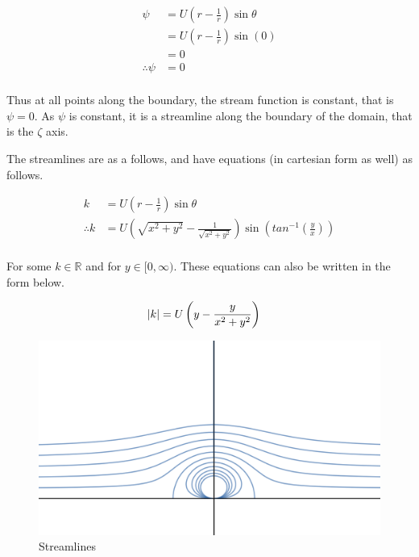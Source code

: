 \documentclass[a4paper]{article}
\begin{document}
\begin{enumerate}[label=\textbf{\arabic*.}]
\begin{enumerate}
\begin{enumerate}
			\begin{align*}
			\psi & = U\left(r - \frac{1}{r}\right)\sin\theta\\
			& = U\left(r - \frac{1}{r}\right)\sin(0)\\
			& = 0\\
			\therefore \psi & = 0\\
			\end{align*}

			Thus at all points along the boundary, the stream function is constant, that is $\displaystyle{\psi = 0}$. As  $\displaystyle{\psi}$ is constant, it is a streamline along the boundary of the domain, that is the $\displaystyle{\zeta}$ axis.

			\pagebreak

			The streamlines are as a follows, and have equations (in cartesian form as well) as follows.

			\begin{align*}
			k & = U\left(r - \frac{1}{r}\right)\sin\theta\\
			\therefore k & = U\left(\sqrt{x^2+y^2} - \frac{1}{\sqrt{x^2+y^2}}\right)\sin\left(tan^{-1}\left(\frac{y}{x}\right) \right)\\
			\end{align*}

			For some $\displaystyle{k \in \mathbb{R}}$ and for $\displaystyle{y \in [0,\infty)}$. These equations can also be written in the form below.

			\begin{align*}
			\abs{k} & = U\left(y - \frac{y}{x^2 + y^2}\right)
			\end{align*}

			\begin{figure}[h!]
			\begin{center}
			\caption{Streamlines}
			\includegraphics[width=\textwidth]{Streamlines_3.png}
			\end{center}
			\end{figure}


\end{enumerate}
\end{enumerate}
\end{enumerate}
\end{document}
